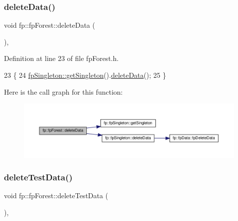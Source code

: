 \subsubsection{\texorpdfstring{delete\+Data()}{deleteData()}}
{\footnotesize\ttfamily void fp\+::fp\+Forest\+::delete\+Data (\begin{DoxyParamCaption}{ }\end{DoxyParamCaption})\hspace{0.3cm}{\ttfamily [inline]}, {\ttfamily [protected]}}



Definition at line 23 of file fp\+Forest.\+h.


\begin{DoxyCode}
23                              \{
24                 \hyperlink{classfp_1_1fpSingleton_a8bdae77b68521003e3fc630edec2e240}{fpSingleton::getSingleton}().\hyperlink{classfp_1_1fpSingleton_a204b85f9d08ca711ca6620b5e020cc1c}{deleteData}();
25             \}
\end{DoxyCode}
Here is the call graph for this function\+:\nopagebreak
\begin{figure}[H]
\begin{center}
\leavevmode
\includegraphics[width=350pt]{classfp_1_1fpForest_a598d32c816dfe5f9793973dcdff2f76e_cgraph}
\end{center}
\end{figure}
\mbox{\label{classfp_1_1fpForest_a3eb78e4e61b289853cc45021f2cf3de0}} 
\subsubsection{\texorpdfstring{delete\+Test\+Data()}{deleteTestData()}}
{\footnotesize\ttfamily void fp\+::fp\+Forest\+::delete\+Test\+Data (\begin{DoxyParamCaption}{ }\end{DoxyParamCaption})\hspace{0.3cm}{\ttfamily [inline]}, {\ttfamily [protected]}}




